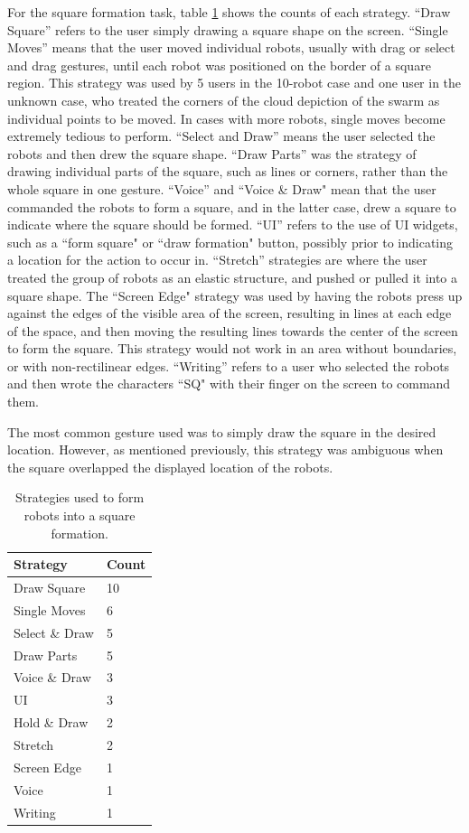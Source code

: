 For the square formation task, table \ref{tab:square_strategies} shows the counts of each strategy. 
``Draw Square'' refers to the user simply drawing a square shape on the screen. 
``Single Moves'' means that the user moved individual robots, usually with drag or select and drag gestures, until each robot was positioned on the border of a square region. 
This strategy was used by 5 users in the 10-robot case and one user in the unknown case, who treated the corners of the cloud depiction of the swarm as individual points to be moved. 
In cases with more robots, single moves become extremely tedious to perform. 
``Select and Draw'' means the user selected the robots and then drew the square shape. 
``Draw Parts'' was the strategy of drawing individual parts of the square, such as lines or corners, rather than the whole square in one gesture. 
``Voice'' and ``Voice \& Draw" mean that the user commanded the robots to form a square, and in the latter case, drew a square to indicate where the square should be formed.
``UI'' refers to the use of UI widgets, such as a ``form square" or ``draw formation" button, possibly prior to indicating a location for the action to occur in. 
``Stretch'' strategies are where the user treated the group of robots as an elastic structure, and pushed or pulled it into a square shape.
The ``Screen Edge" strategy was used by having the robots press up against the edges of the visible area of the screen, resulting in lines at each edge of the space, and then moving the resulting lines towards the center of the screen to form the square. 
This strategy would not work in an area without boundaries, or with non-rectilinear edges. 
``Writing'' refers to a user who selected the robots and then wrote the characters ``SQ" with their finger on the screen to command them. 

The most common gesture used was to simply draw the square in the desired location. 
However, as mentioned previously, this strategy was ambiguous when the square overlapped the displayed location of the robots.

\begin{table}
	\begin{tabular}{l l}
		Strategy & Count\\
		\hline
		Draw Square & 10\\
		Single Moves & 6\\
		Select \& Draw & 5\\
		Draw Parts & 5 \\
		Voice \& Draw & 3\\
		UI & 3\\
		Hold \& Draw & 2\\
		Stretch & 2\\
		Screen Edge & 1\\
		Voice & 1\\
		Writing & 1\\
	\end{tabular}
	\caption{Strategies used to form robots into a square formation.}
	\label{tab:square_strategies}
\end{table}

